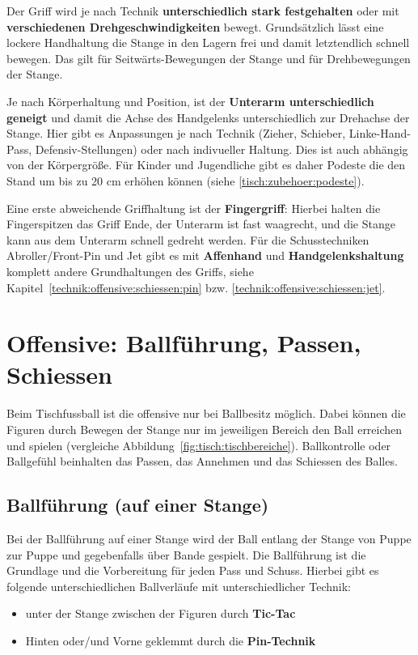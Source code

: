 Der Griff wird je nach Technik \textbf{unterschiedlich stark festgehalten} oder mit \textbf{verschiedenen Drehgeschwindigkeiten} bewegt.
Grundsätzlich lässt eine lockere Handhaltung die Stange in den Lagern frei und damit letztendlich schnell bewegen.
Das gilt für Seitwärts-Bewegungen der Stange und für Drehbewegungen der Stange.

Je nach Körperhaltung und Position, ist der \textbf{Unterarm unterschiedlich geneigt} und damit die Achse des Handgelenks unterschiedlich zur Drehachse der Stange.
Hier gibt es Anpassungen je nach Technik (Zieher, Schieber, Linke-Hand-Pass, Defensiv-Stellungen) oder nach indivueller Haltung.
Dies ist auch abhängig von der Körpergröße. 
Für Kinder und Jugendliche gibt es daher Podeste die den Stand um bis zu 20 cm erhöhen können (siehe \ref{tisch:zubehoer:podeste}).


Eine erste abweichende Griffhaltung ist der \textbf{Fingergriff}: Hierbei halten die Fingerspitzen das Griff Ende, der Unterarm ist fast waagrecht, und die Stange kann aus dem Unterarm schnell gedreht werden.
Für die Schusstechniken Abroller/Front-Pin und Jet gibt es mit \textbf{Affenhand} und \textbf{Handgelenkshaltung} komplett andere Grundhaltungen des Griffs, siehe Kapitel~\ref{technik:offensive:schiessen:pin} bzw. \ref{technik:offensive:schiessen:jet}.


\section{Offensive: Ballführung, Passen, Schiessen}
\label{technik:offensive}

Beim Tischfussball ist die \gls{offensive} nur bei Ballbesitz möglich.
Dabei können die Figuren durch Bewegen der Stange nur im jeweiligen Bereich den Ball erreichen und spielen (vergleiche Abbildung~\ref{fig:tisch:tischbereiche}).
Ballkontrolle oder Ballgefühl beinhalten das Passen, das Annehmen und das Schiessen des Balles.

\subsection{Ballführung (auf einer Stange)} 
\label{technik:offensive:eine}

Bei der Ballführung auf einer Stange wird der Ball entlang der Stange von Puppe zur Puppe und gegebenfalls über Bande gespielt. 
Die Ballführung ist die Grundlage und die Vorbereitung für jeden Pass und Schuss.
Hierbei gibt es folgende unterschiedlichen Ballverläufe mit unterschiedlicher Technik:
\begin{itemize}
    \item unter der Stange zwischen der Figuren durch \textbf{Tic-Tac}
    \item Hinten oder/und Vorne geklemmt durch die \textbf{Pin-Technik}
\end{itemize}

